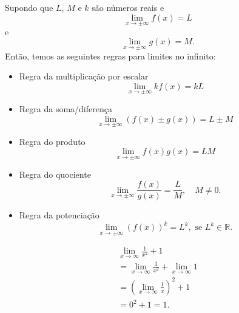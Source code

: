 \begin{obs}\label{obs:lim_regras_xinf}
Supondo que $L$, $M$ e $k$ são números reais e
\begin{equation}
  \lim_{x\to \pm\infty} f(x) = L
\end{equation}
e
\begin{equation}
  \lim_{x\to\pm\infty}g(x) = M.
\end{equation}
Então, temos as seguintes regras para limites no infinito:
\begin{itemize}
\item Regra da multiplicação por escalar
  \begin{equation}
    \lim_{x\to\pm\infty} kf(x) = kL
  \end{equation}
\item Regra da soma/diferença
  \begin{equation}
    \lim_{x\to\pm\infty} (f(x)\pm g(x)) = L\pm M
  \end{equation}
\item Regra do produto
  \begin{equation}
    \lim_{x\to\pm\infty} f(x)g(x) = LM
  \end{equation}
\item Regra do quociente
  \begin{equation}
    \lim_{x\to\pm\infty} \frac{f(x)}{g(x)} = \frac{L}{M},\quad M\neq 0.
  \end{equation}
\item Regra da potenciação
  \begin{equation}
    \lim_{x\to\pm\infty} (f(x))^k = L^k,\text{ se } L^k\in\mathbb{R}.
  \end{equation}
\end{itemize}
\end{obs}

\begin{ex}
  \begin{gather}
    \lim_{x\to \infty} \frac{1}{x^2}+1 \\
    = \lim_{x\to \infty} \frac{1}{x^2} + \lim_{x\to \infty}1 \\
    = \left(\lim_{x\to\infty} \frac{1}{x}\right)^2 + 1\\
    = 0^2 + 1 = 1.
\end{gather}
\end{ex}

